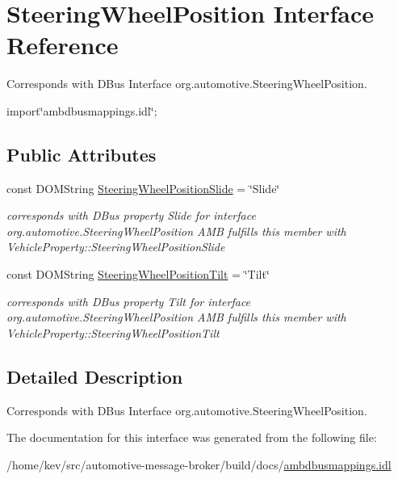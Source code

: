 \hypertarget{interfaceSteeringWheelPosition}{\section{Steering\+Wheel\+Position Interface Reference}
\label{interfaceSteeringWheelPosition}
}


Corresponds with D\+Bus Interface org.\+automotive.\+Steering\+Wheel\+Position.  




{\ttfamily import\char`\"{}ambdbusmappings.\+idl\char`\"{};}

\subsection*{Public Attributes}
\begin{DoxyCompactItemize}
\item 
\hypertarget{interfaceSteeringWheelPosition_aece28628ff6bd3a04ea7d7424c0c4cfe}{const D\+O\+M\+String \hyperlink{interfaceSteeringWheelPosition_aece28628ff6bd3a04ea7d7424c0c4cfe}{Steering\+Wheel\+Position\+Slide} = \char`\"{}Slide\char`\"{}}\label{interfaceSteeringWheelPosition_aece28628ff6bd3a04ea7d7424c0c4cfe}

\begin{DoxyCompactList}\small\item\em corresponds with D\+Bus property Slide for interface org.\+automotive.\+Steering\+Wheel\+Position A\+M\+B fulfills this member with Vehicle\+Property\+::\+Steering\+Wheel\+Position\+Slide \end{DoxyCompactList}\item 
\hypertarget{interfaceSteeringWheelPosition_a9d9c029923c4608d054de610212b2a0e}{const D\+O\+M\+String \hyperlink{interfaceSteeringWheelPosition_a9d9c029923c4608d054de610212b2a0e}{Steering\+Wheel\+Position\+Tilt} = \char`\"{}Tilt\char`\"{}}\label{interfaceSteeringWheelPosition_a9d9c029923c4608d054de610212b2a0e}

\begin{DoxyCompactList}\small\item\em corresponds with D\+Bus property Tilt for interface org.\+automotive.\+Steering\+Wheel\+Position A\+M\+B fulfills this member with Vehicle\+Property\+::\+Steering\+Wheel\+Position\+Tilt \end{DoxyCompactList}\end{DoxyCompactItemize}


\subsection{Detailed Description}
Corresponds with D\+Bus Interface org.\+automotive.\+Steering\+Wheel\+Position. 

The documentation for this interface was generated from the following file\+:\begin{DoxyCompactItemize}
\item 
/home/kev/src/automotive-\/message-\/broker/build/docs/\hyperlink{ambdbusmappings_8idl}{ambdbusmappings.\+idl}\end{DoxyCompactItemize}
